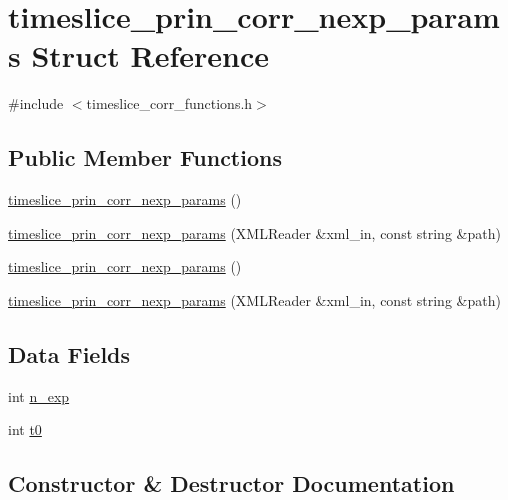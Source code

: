 \hypertarget{structtimeslice__prin__corr__nexp__params}{}\section{timeslice\+\_\+prin\+\_\+corr\+\_\+nexp\+\_\+params Struct Reference}
\label{structtimeslice__prin__corr__nexp__params}


{\ttfamily \#include $<$timeslice\+\_\+corr\+\_\+functions.\+h$>$}

\subsection*{Public Member Functions}
\begin{DoxyCompactItemize}
\item 
\mbox{\hyperlink{structtimeslice__prin__corr__nexp__params_aa73481d060cb2941fa63418415d873f2}{timeslice\+\_\+prin\+\_\+corr\+\_\+nexp\+\_\+params}} ()
\item 
\mbox{\hyperlink{structtimeslice__prin__corr__nexp__params_a8da16318e00097acfaa68885897adb52}{timeslice\+\_\+prin\+\_\+corr\+\_\+nexp\+\_\+params}} (X\+M\+L\+Reader \&xml\+\_\+in, const string \&path)
\item 
\mbox{\hyperlink{structtimeslice__prin__corr__nexp__params_aa73481d060cb2941fa63418415d873f2}{timeslice\+\_\+prin\+\_\+corr\+\_\+nexp\+\_\+params}} ()
\item 
\mbox{\hyperlink{structtimeslice__prin__corr__nexp__params_a8da16318e00097acfaa68885897adb52}{timeslice\+\_\+prin\+\_\+corr\+\_\+nexp\+\_\+params}} (X\+M\+L\+Reader \&xml\+\_\+in, const string \&path)
\end{DoxyCompactItemize}
\subsection*{Data Fields}
\begin{DoxyCompactItemize}
\item 
int \mbox{\hyperlink{structtimeslice__prin__corr__nexp__params_a1baf6067f83b6912a0347c8dc0cb3fb8}{n\+\_\+exp}}
\item 
int \mbox{\hyperlink{structtimeslice__prin__corr__nexp__params_a0398087a40ff9b89ebff00ae5c298070}{t0}}
\end{DoxyCompactItemize}


\subsection{Constructor \& Destructor Documentation}
\mbox{\label{structtimeslice__prin__corr__nexp__params_aa73481d060cb2941fa63418415d873f2}} 
